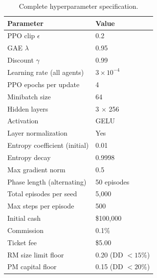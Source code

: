 \documentclass[11pt]{article}
\begin{document}
\begin{table}[h]
\centering
\begin{tabular}{@{}ll@{}}
\toprule
\textbf{Parameter} & \textbf{Value} \\ \midrule
PPO clip $\epsilon$ & 0.2 \\
GAE $\lambda$ & 0.95 \\
Discount $\gamma$ & 0.99 \\
Learning rate (all agents) & $3 \times 10^{-4}$ \\
PPO epochs per update & 4 \\
Minibatch size & 64 \\
Hidden layers & 3 $\times$ 256 \\
Activation & GELU \\
Layer normalization & Yes \\
Entropy coefficient (initial) & 0.01 \\
Entropy decay & 0.9998 \\
Max gradient norm & 0.5 \\
Phase length (alternating) & 50 episodes \\
Total episodes per seed & 5{,}000 \\
Max steps per episode & 500 \\
Initial cash & \$100{,}000 \\
Commission & 0.1\% \\
Ticket fee & \$5.00 \\
RM size limit floor & 0.20 (DD $< 15\%$) \\
PM capital floor & 0.15 (DD $< 20\%$) \\
\bottomrule
\end{tabular}
\caption{Complete hyperparameter specification.}
\label{tab:hyperparams}
\end{table}
\end{document}
